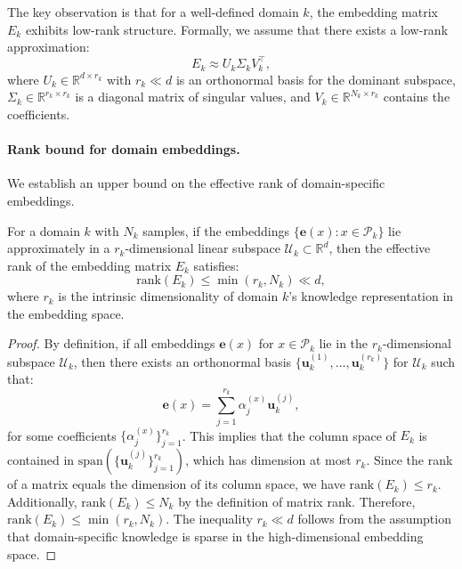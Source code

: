 The key observation is that for a well-defined domain $k$, the embedding matrix $E_k$ exhibits low-rank structure.
Formally, we assume that there exists a low-rank approximation:
\begin{equation}
E_k \approx U_k \Sigma_k V_k^\top,
\end{equation}
where $U_k \in \mathbb{R}^{d \times r_k}$ with $r_k \ll d$ is an orthonormal basis for the dominant subspace, $\Sigma_k \in \mathbb{R}^{r_k \times r_k}$ is a diagonal matrix of singular values, and $V_k \in \mathbb{R}^{N_k \times r_k}$ contains the coefficients.

\paragraph{Rank bound for domain embeddings.}
We establish an upper bound on the effective rank of domain-specific embeddings.

\begin{theorem}
\label{thm:domain_rank_bound}
For a domain $k$ with $N_k$ samples, if the embeddings $\{\mathbf{e}(x): x \in \mathcal{P}_k\}$ lie approximately in a $r_k$-dimensional linear subspace $\mathcal{U}_k \subset \mathbb{R}^d$, then the effective rank of the embedding matrix $E_k$ satisfies:
\begin{equation}
\mathrm{rank}(E_k) \leq \min(r_k, N_k) \ll d,
\end{equation}
where $r_k$ is the intrinsic dimensionality of domain $k$'s knowledge representation in the embedding space.
\end{theorem}

\begin{proof}
By definition, if all embeddings $\mathbf{e}(x)$ for $x \in \mathcal{P}_k$ lie in the $r_k$-dimensional subspace $\mathcal{U}_k$, then there exists an orthonormal basis $\{\mathbf{u}_k^{(1)}, \ldots, \mathbf{u}_k^{(r_k)}\}$ for $\mathcal{U}_k$ such that:
\begin{equation}
\mathbf{e}(x) = \sum_{j=1}^{r_k} \alpha_j^{(x)} \mathbf{u}_k^{(j)},
\end{equation}
for some coefficients $\{\alpha_j^{(x)}\}_{j=1}^{r_k}$.
This implies that the column space of $E_k$ is contained in $\mathrm{span}(\{\mathbf{u}_k^{(j)}\}_{j=1}^{r_k})$, which has dimension at most $r_k$.
Since the rank of a matrix equals the dimension of its column space, we have $\mathrm{rank}(E_k) \leq r_k$.
Additionally, $\mathrm{rank}(E_k) \leq N_k$ by the definition of matrix rank.
Therefore, $\mathrm{rank}(E_k) \leq \min(r_k, N_k)$.
The inequality $r_k \ll d$ follows from the assumption that domain-specific knowledge is sparse in the high-dimensional embedding space.
\end{proof}

